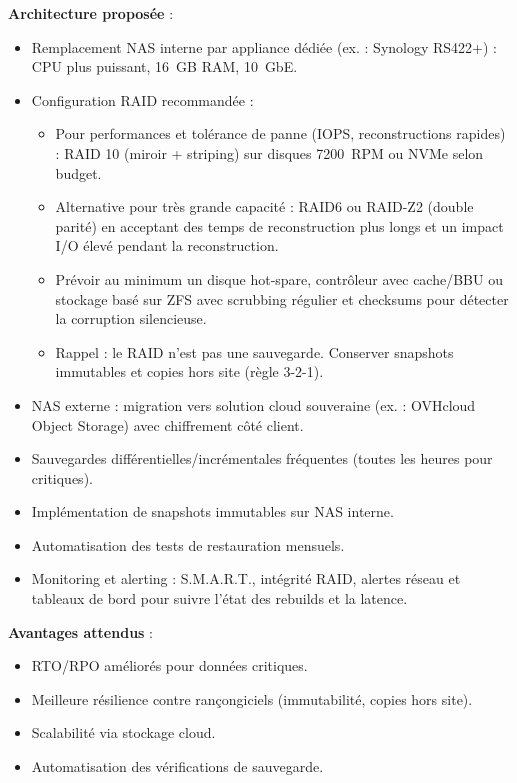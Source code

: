 \noindent \textbf{Architecture proposée} :
\begin{itemize}
	\item Remplacement NAS interne par appliance dédiée (ex. : Synology RS422+) : CPU plus puissant, 16~GB RAM, 10~GbE.
	\item Configuration RAID recommandée :
	\begin{itemize}
		\item Pour performances et tolérance de panne (IOPS, reconstructions rapides) : RAID 10 (miroir + striping) sur disques 7200~RPM ou NVMe selon budget.
		\item Alternative pour très grande capacité : RAID6 ou RAID-Z2 (double parité) en acceptant des temps de reconstruction plus longs et un impact I/O élevé pendant la reconstruction.
		\item Prévoir au minimum un disque hot-spare, contrôleur avec cache/BBU ou stockage basé sur ZFS avec scrubbing régulier et checksums pour détecter la corruption silencieuse.
		\item Rappel : le RAID n'est pas une sauvegarde. Conserver snapshots immutables et copies hors site (règle 3-2-1).
	\end{itemize}
	\item NAS externe : migration vers solution cloud souveraine (ex. : OVHcloud Object Storage) avec chiffrement côté client.
	\item Sauvegardes différentielles/incrémentales fréquentes (toutes les heures pour critiques).
	\item Implémentation de snapshots immutables sur NAS interne.
	\item Automatisation des tests de restauration mensuels.
	\item Monitoring et alerting : S.M.A.R.T., intégrité RAID, alertes réseau et tableaux de bord pour suivre l'état des rebuilds et la latence.
\end{itemize}

\vspace{0.5cm}

\noindent \textbf{Avantages attendus} :
\begin{itemize}
	\item RTO/RPO améliorés pour données critiques.
	\item Meilleure résilience contre rançongiciels (immutabilité, copies hors site).
	\item Scalabilité via stockage cloud.
	\item Automatisation des vérifications de sauvegarde.
\end{itemize}

